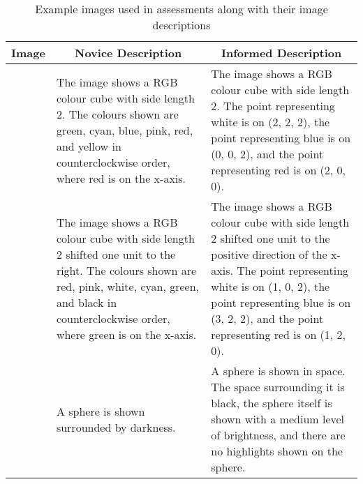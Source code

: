 \documentclass[sigconf,authordraft]{acmart}
\begin{document}
\begin{table*}
    \centering
    \caption{Example images used in assessments along with their image descriptions}
    \label{Images}
    \begin{tabular}{|c|p{5cm}|p{5cm}|}
        \hline
        \multicolumn{1}{|c|}{Image} & \multicolumn{1}{|c|}{Novice Description} & \multicolumn{1}{|c|}{Informed Description} \\ \hline\hline
        \raisebox{-0.94\totalheight}{\texttt{[image: cube1.png]}} & The image shows a RGB colour cube with side length 2. The colours shown are green, cyan, blue, pink, red, and yellow in counterclockwise order, where red is on the x-axis. & The image shows a RGB colour cube with side length 2. The point representing white is on (2, 2, 2), the point representing blue is on (0, 0, 2), and the point representing red is on (2, 0, 0). \\ \hline
        \raisebox{-0.94\totalheight}{\texttt{[image: cube2.png]}} & The image shows a RGB colour cube with side length 2 shifted one unit to the right. The colours shown are red, pink, white, cyan, green, and black in counterclockwise order, where green is on the x-axis. & The image shows a RGB colour cube with side length 2 shifted one unit to the positive direction of the x-axis. The point representing white is on (1, 0, 2), the point representing blue is on (3, 2, 2), and the point representing red is on (1, 2, 0). \\ \hline
        \raisebox{-0.94\totalheight}{\texttt{[image: light.png]}} & A sphere is shown surrounded by darkness. & A sphere is shown in space. The space surrounding it is black, the sphere itself is shown with a medium level of brightness, and there are no highlights shown on the sphere. \\ \hline
    \end{tabular}
\end{table*}
\end{document}

